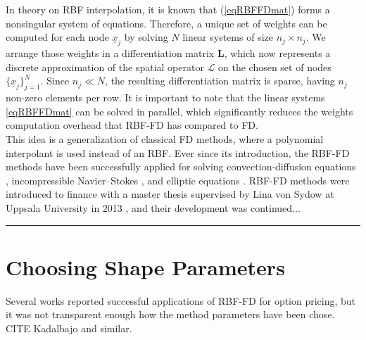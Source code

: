 \documentclass{UUThesisTemplate}
\begin{document}
In theory on RBF interpolation, it is known that (\ref{eqRBFFDmat}) forms a nonsingular system of equations. Therefore, a unique set of weights can be computed for each node $\underline{x}_j$ by solving $N$ linear systems of size $n_j\times n_j$. We arrange those weights in a differentiation matrix $\mathbf{L}$, which now represents a discrete approximation of the spatial operator $\mathcal{L}$ on the chosen set of nodes $\{\underline{x}_j\}_{j=1}^N$. Since $n_j \ll N$, the resulting differentiation matrix is sparse, having $n_j$ non-zero elements per row. It is important to note that the linear systems \eqref{eqRBFFDmat} can be solved in parallel, which significantly reduces the weights computation overhead that RBF-FD has compared to FD. \\
This idea is a generalization of classical FD methods, where a polynomial interpolant is used instead of an RBF. Ever since its introduction, the RBF-FD methods have been successfully applied for solving convection-diffusion equations \cite{chandhini2007local, stevens2009use}, incompressible Navier--Stokes \cite{shu2003local, shan2008application, chinchapatnam2009compact}, and elliptic equations \cite{tolstykh2003using, wright2006scattered}. RBF-FD methods were introduced to finance with a master thesis supervised by Lina von Sydow at Uppsala University in 2013 \cite{wang2013radial}, and their development was continued...

\vspace{1cm}
{\color{red}\hrule}
%
\section{Choosing Shape Parameters}
Several works reported successful applications of RBF-FD for option pricing, but it was not transparent enough how the method parameters have been chose. CITE Kadalbajo and similar.
%
\end{document}
